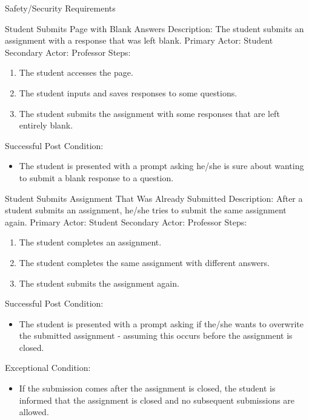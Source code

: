\documentclass{article}
\begin{document}
\begin{section}{Safety/Security Requirements}
\begin{subsection}{Student Submits Page with Blank Answers}
Description: The student submits an assignment with a response that was left blank. \newline
Primary Actor: Student \newline
Secondary Actor: Professor \newline
Steps:
\begin{enumerate}
\item{The student accesses the page.}
\item{The student inputs and saves responses to some questions.}
\item{The student submits the assignment with some responses that are left entirely blank.}
\end{enumerate}
Successful Post Condition:
\begin{itemize}
\item{The student is presented with a prompt asking he/she is sure about wanting to submit a blank response to a question.}
\end{itemize}

\end{subsection}

\begin{subsection}{Student Submits Assignment That Was Already Submitted}
Description: After a student submits an assignment, he/she tries to submit the same assignment again. \newline
Primary Actor: Student \newline
Secondary Actor: Professor \newline
Steps:
\begin{enumerate}
\item{The student completes an assignment.}
\item{The student completes the same assignment with different answers.}
\item{The student submits the assignment again.}
\end{enumerate}
Successful Post Condition:
\begin{itemize}
\item{The student is presented with a prompt asking if the/she wants to overwrite the submitted assignment - assuming this occurs before the assignment is closed.} 
\end{itemize}
Exceptional Condition:
\begin{itemize}
\item{If the submission comes after the assignment is closed, the student is informed that the assignment is closed and no subsequent submissions are allowed.} 
\end{itemize}
\end{subsection}


\end{section}
\end{document}
